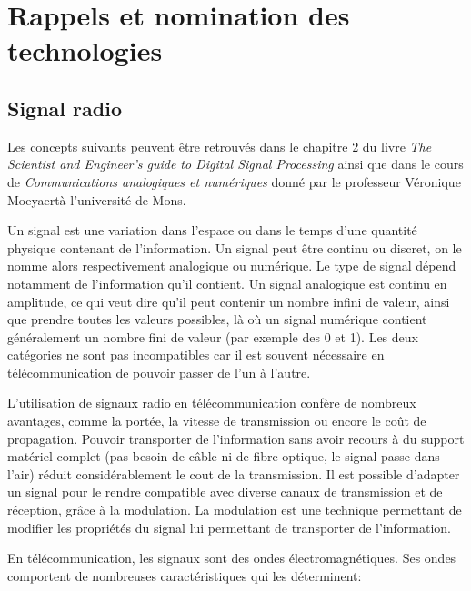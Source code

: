 \renewcommand{\leftmark}{NOMINATION DES TECHNOLOGIES}


\chapter{Rappels et nomination des technologies}\label{chap1}

\section{Signal radio}

Les concepts suivants peuvent être retrouvés dans le chapitre 2 du livre \textit{The Scientist and Engineer's guide to Digital Signal Processing}\cite{book2} ainsi que dans le cours de \textit{Communications analogiques et numériques} donné par le professeur Véronique Moeyaertà l'université de Mons.

\vspace{0.1cm}

Un signal est une variation dans l'espace ou dans le temps d'une quantité physique contenant de l'information. Un signal peut être continu ou discret, on le nomme alors respectivement analogique ou numérique. Le type de signal dépend notamment de l'information qu'il contient. Un signal analogique est continu en amplitude, ce qui veut dire qu'il peut contenir un nombre infini de valeur, ainsi que prendre toutes les valeurs possibles, là où un signal numérique contient généralement un nombre fini de valeur (par exemple des 0 et 1).
Les deux catégories ne sont pas incompatibles car il est souvent nécessaire en télécommunication de pouvoir passer de l'un à l'autre.

\vspace{0.1cm}

L'utilisation de signaux radio en télécommunication confère de nombreux avantages, comme la portée, la vitesse de transmission  ou encore le coût de propagation. Pouvoir transporter de l'information sans avoir recours à du support matériel complet (pas besoin de câble ni de fibre optique, le signal passe dans l'air) réduit considérablement le cout de la transmission. Il est possible d'adapter un signal pour le rendre compatible avec diverse canaux de transmission et de réception, grâce à la modulation. La modulation est une technique permettant de modifier les propriétés du signal lui permettant de transporter de l'information.

\newpage

En télécommunication, les signaux sont des ondes électromagnétiques. Ses ondes comportent de nombreuses caractéristiques qui les déterminent: 

